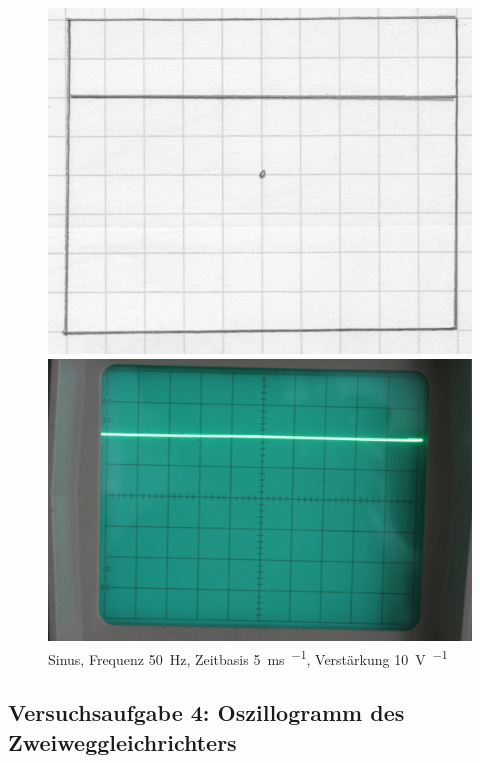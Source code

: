 \begin{figure}[htbp]
	\centering
	\begin{minipage}{.45\linewidth}
	\includegraphics[width=\linewidth]{Oszi_Hand/795.jpg}
	\end{minipage}
	\hfill
	\begin{minipage}{.45\linewidth}
	\includegraphics[width=\linewidth]{Oszi_Foto/795.jpg}
	\end{minipage}
	\caption{%
		Sinus, Frequenz \SI{50}{\hertz},
		Zeitbasis \SI{5}{\milli\second\per\division},
		Verstärkung \SI{10}{\volt\per\division}
	}
	\label{fig:795}
\end{figure}

\FloatBarrier
\subsection{Versuchsaufgabe 4: Oszillogramm des Zweiweggleichrichters}

